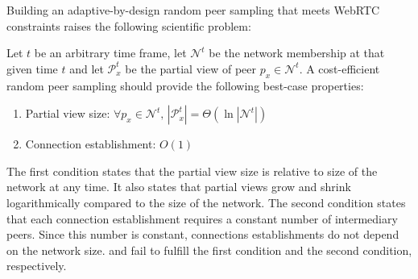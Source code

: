 Building an adaptive-by-design random peer sampling that meets WebRTC
constraints raises the following scientific problem:

\begin{problem}
  Let $t$ be an arbitrary time frame, let $\mathcal{N}^t$ be the
  network membership at that given time $t$ and let $\mathcal{P}_x^t$
  be the partial view of peer $p_x \in \mathcal{N}^t$.  A
  cost-efficient random peer sampling should provide the following
  best-case properties:
  \begin{enumerate}
  \item  \begin{center}
    Partial view size: \hfill
    $\forall p_x \in \mathcal{N}^t,\, |\mathcal{P}_x^t| = \Theta (\ln
    |\mathcal{N}^t|)$
  \end{center}
  
\item \begin{center}
    Connection establishment: \hfill $O(1)$
  \end{center} 
  \end{enumerate}
\end{problem}

The first condition states that the partial view size is relative to size of
the network at any time. It also states that partial views grow and shrink
logarithmically compared to the size of the network. The second condition
states that each connection establishment requires a constant number of
intermediary peers. Since this number is constant, connections establishments
do not depend on the network size.
\CYCLON and \SCAMP fail to fulfill the first condition and the second
condition, respectively.

